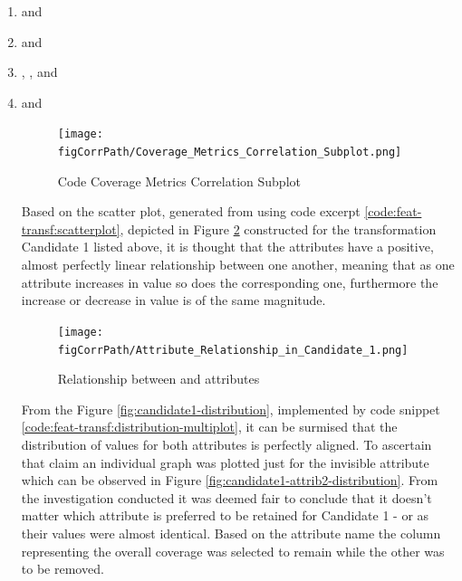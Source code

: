 \begin{enumerate}\label{lst:corr-sub:code-coverage-transf-candidates}
    \item \overallBranchCoverage{} and \branchCoverage{}
    \item \overallUncoveredLines{} and \uncoveredLines{}
    \item \overallCoverage{}, \overallLineCoverage{}, \coverage{} and \lineCoverage{}
    \item \overallUncoveredConditions and \uncoveredConditions{}

\begin{figure}[!h]
    \centering
    \texttt{[image: \\figCorrPath/Coverage\_Metrics\_Correlation\_Subplot.png]}
    \caption{Code Coverage Metrics Correlation Subplot}
    \label{fig:correlation-coverage-metrics-subplot}
\end{figure}
\FloatBarrier

Based on the scatter plot, generated from using code excerpt \ref{code:feat-transf:scatterplot}, depicted in Figure \ref{fig:candidate1-scatterplot} constructed for the transformation Candidate 1 listed above, it is thought that the attributes have a positive, almost perfectly linear relationship between one another, meaning that as one attribute increases in value so does the corresponding one, furthermore the increase or decrease in value is of the same magnitude.
\begin{figure}[!h]
    \centering
    \texttt{[image: \\figCorrPath/Attribute\_Relationship\_in\_Candidate\_1.png]}
    \caption{Relationship between \overallBranchCoverage{} and \branchCoverage{} attributes}
    \label{fig:candidate1-scatterplot}
\end{figure}

From the Figure \ref{fig:candidate1-distribution}, implemented by code snippet \ref{code:feat-transf:distribution-multiplot}, it can be surmised that the distribution of values for both attributes is perfectly aligned. To ascertain that claim an individual graph was plotted just for the invisible attribute \overallBranchCoverage{} which can be observed in Figure \ref{fig:candidate1-attrib2-distribution}.
From the investigation conducted it was deemed fair to conclude that it doesn't matter which attribute is preferred to be retained for Candidate 1 - \overallBranchCoverage{} or \branchCoverage{} as their values were almost identical. Based on the attribute name the column representing the overall coverage was selected to remain while the other was to be removed.


\end{enumerate}
